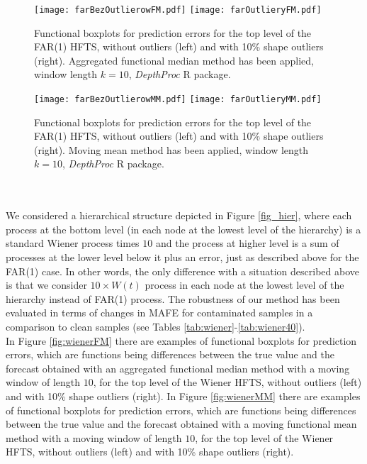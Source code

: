 \documentclass[12pt,a4paper]{article}
\numberwithin{equation}{section}
\begin{document}
\begin{figure*}
\texttt{[image: farBezOutlierowFM.pdf]}
\texttt{[image: farOutlieryFM.pdf]}
\caption{Functional boxplots for prediction errors for the top level of the FAR(1) HFTS, without outliers (left) and with 10\% shape outliers (right). Aggregated functional median method has been applied, window length $k=10$, \textit{DepthProc} R package.}
\label{fig:hfts_comp}
\end{figure*}
\begin{figure*}
\texttt{[image: farBezOutlierowMM.pdf]}
\texttt{[image: farOutlieryMM.pdf]}
\caption{Functional boxplots for prediction errors for the top level of the FAR(1) HFTS, without outliers (left) and with 10\% shape outliers (right). 
Moving mean method has been applied, window length $k=10$, \textit{DepthProc} R package.}
\label{fig:movingmean}
\end{figure*}
\\
\\ We considered a hierarchical structure depicted in Figure \ref{fig_hier}, where each process at the bottom level (in each node at the lowest level of the hierarchy) is a standard Wiener process times $10$ and the process at higher level is a sum of processes at the lower level below it plus an error, just as described above for the FAR(1) case. In other words, the only difference with a situation described above is that we consider $10\times W(t)$ process in each node at the lowest level of the hierarchy instead of FAR(1) process. 
The robustness of our method has been evaluated in terms of changes in MAFE for contaminated samples in a comparison to clean samples (see Tables \ref{tab:wiener}-\ref{tab:wiener40}).
\\ In Figure \ref{fig:wienerFM} there are examples of functional boxplots for prediction errors, which are functions being differences between the true value and the forecast obtained with an aggregated functional median method with a moving window of length $10$, for the top level of the Wiener HFTS, without outliers (left) and with 10\% shape outliers (right). In Figure \ref{fig:wienerMM} there are examples of functional boxplots for prediction errors, which are functions being differences between the true value and the forecast obtained with a moving functional mean method with a moving window of length $10$, for the top level of the Wiener HFTS, without outliers (left) and with 10\% shape outliers (right). 
\\
\end{document}
